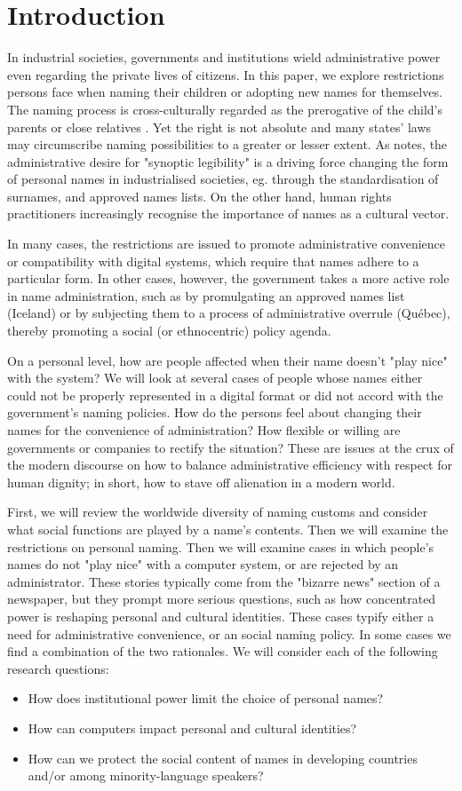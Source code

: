\section{Introduction}

In industrial societies, governments and institutions wield administrative power
even regarding the private lives of citizens. In this paper, we explore
restrictions persons face when naming their children or adopting new names for
themselves.  The naming process is cross-culturally regarded as the prerogative
of the child's parents or close relatives \parencite{alford02}. Yet the right is
not absolute and many states' laws may circumscribe naming possibilities to a
greater or lesser extent. As \textcite{scott02} notes, the administrative desire
for "synoptic legibility" is a driving force changing the form of personal names
in industrialised societies, eg. through the standardisation of surnames, and
approved names lists. On the other hand, human rights practitioners increasingly
recognise the importance of names as a cultural vector.

In many cases, the restrictions are issued to promote administrative convenience
or compatibility with digital systems, which require that names adhere to a
particular form. In other cases, however, the government takes a more active
role in name administration, such as by promulgating an approved names list
(Iceland) or by subjecting them to a process of administrative overrule
(Québec), thereby promoting a social (or ethnocentric) policy agenda.

On a personal level, how are people affected when their name doesn't "play nice"
with the system? We will look at several cases of people whose names either
could not be properly represented in a digital format or did not accord with the
government's naming policies. How do the persons feel about changing their names
for the convenience of administration? How flexible or willing are governments
or companies to rectify the situation? These are issues at the crux of the
modern discourse on how to balance administrative efficiency with respect for
human dignity; in short, how to stave off alienation in a modern world.

First, we will review the worldwide diversity of naming customs and consider
what social functions are played by a name's contents. Then we will examine the
restrictions on personal naming. Then we will examine cases in which people's
names do not "play nice" with a computer system, or are rejected by an
administrator. These stories typically come from the "bizarre news" section of a
newspaper, but they prompt more serious questions, such as how concentrated
power is reshaping personal and cultural identities. These cases typify either a
need for administrative convenience, or an social naming policy. In some cases
we find a combination of the two rationales. We will consider each of the
following research questions:

\begin{itemize}
\item How does institutional power limit the choice of personal names?
\item How can computers impact personal and cultural identities?
\item How can we protect the social content of names in developing countries
and/or among minority-language speakers?
\end{itemize}
